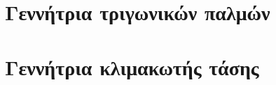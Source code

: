 \newcommand{\reporttitle}{Εργαστηριακές Ασκήσεις}
\newcommand{\reportauthorOne}{Καπετάνιος Αντώνιος}
\newcommand{\cidOne}{10417}
\newcommand{\reportauthorTwo}{Χαλκιάς Νικόλαος Μάριος}
\newcommand{\cidTwo}{}





	

	\tableofcontents
	\newpage

	\chapter{Γεννήτρια τριγωνικών παλμών}
		

	\chapter{Γεννήτρια κλιμακωτής τάσης}
		

	\printbibliography[title={Αναφορές}]

